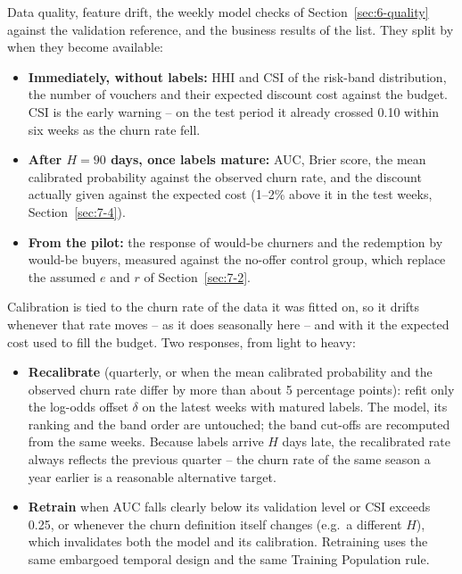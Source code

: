 Data quality, feature drift, the weekly model checks of Section~\ref{sec:6-quality} against the validation reference, and the business results of the list. They split by when they become available:

\begin{itemize}
    \item \textbf{Immediately, without labels:} HHI and CSI of the risk-band distribution, the number of vouchers and their expected discount cost against the budget. CSI is the early warning -- on the test period it already crossed 0.10 within six weeks as the churn rate fell.
    \item \textbf{After $H = 90$ days, once labels mature:} AUC, Brier score, the mean calibrated probability against the observed churn rate, and the discount actually given against the expected cost (1--2\% above it in the test weeks, Section~\ref{sec:7-4}).
    \item \textbf{From the pilot:} the response of would-be churners and the redemption by would-be buyers, measured against the no-offer control group, which replace the assumed $e$ and $r$ of Section~\ref{sec:7-2}.
\end{itemize}

Calibration is tied to the churn rate of the data it was fitted on, so it drifts whenever that rate moves -- as it does seasonally here -- and with it the expected cost used to fill the budget. Two responses, from light to heavy:

\begin{itemize}
    \item \textbf{Recalibrate} (quarterly, or when the mean calibrated probability and the observed churn rate differ by more than about 5 percentage points): refit only the log-odds offset $\delta$ on the latest weeks with matured labels. The model, its ranking and the band order are untouched; the band cut-offs are recomputed from the same weeks. Because labels arrive $H$ days late, the recalibrated rate always reflects the previous quarter -- the churn rate of the same season a year earlier is a reasonable alternative target.
    \item \textbf{Retrain} when AUC falls clearly below its validation level or CSI exceeds 0.25, or whenever the churn definition itself changes (e.g.\ a different $H$), which invalidates both the model and its calibration. Retraining uses the same embargoed temporal design and the same Training Population rule.
\end{itemize}
